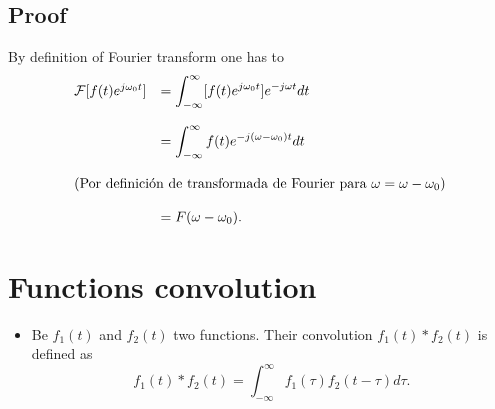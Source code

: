 \subsection*{Proof}
\noindent By definition of Fourier transform one has to
\begin{equation*}
  \begin{array}{rl}
    {\cal F}[f(t)e^{j\omega_0t}] & = \displaystyle\int_{-\infty}^\infty
    [f(t)e^{j\omega_0t}]e^{-j\omega t}dt\\\\
    & = \displaystyle\int_{-\infty}^\infty
    f(t)e^{-j(\omega-\omega_0)t}dt\\\\
    \multicolumn{2}{l}{\text{(Por definici\'on de transformada de Fourier
        para $\omega=\omega-\omega_0$)}}\\\\
    & = F(\omega-\omega_0).
  \end{array}
\end{equation*}

\section{Functions convolution}
\begin{itemize}
\item Be $f_1(t)$ and $f_2(t)$ two functions. Their convolution
  $f_1(t)*f_2(t)$ is defined as~\cite{Gonzalez}
  \begin{equation}
    f_1(t)*f_2(t)=\int_{-\infty}^\infty f_1(\tau)f_2(t-\tau)d\tau.
    \tag{$f_1(t)*f_2(t)$}%
    \label{eq:convolucion}
  \end{equation}
\end{itemize}

